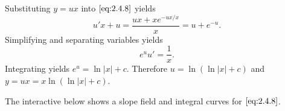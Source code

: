 \documentclass{ximera}
\begin{document}
Substituting  $y=ux$
into $\eqref{eq:2.4.8}$ yields
$$
u'x+u =  \frac{ux+xe^{-ux/x}}{x} = u+e^{-u}.
$$
 Simplifying and separating variables yields
$$
e^uu'=\frac{1}{x}.
$$
Integrating yields
$e^u=\ln |x|+c$.
Therefore
$u=\ln(\ln|x|+c)$ and
$y=ux=x \ln (\ln |x|+c)$.

The interactive below shows
a slope field and integral curves for $\eqref{eq:2.4.8}$.

\begin{center}
\end{center}
\end{document}
